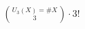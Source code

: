 \documentclass[preview]{standalone}
\begin{document}
\begin{align*}
{U_3( X ) =  \# X \choose 3} \cdot 3!
\end{align*}
\end{document}
